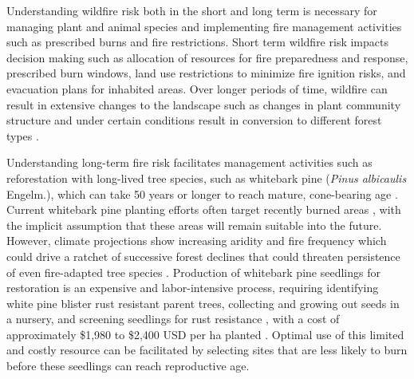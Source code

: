 \documentclass[11p]{article}
\begin{document}
Understanding wildfire risk both in the short and long term is necessary for managing plant and animal species and implementing fire management activities such as prescribed burns and fire restrictions. Short term wildfire risk impacts decision making such as allocation of resources for fire preparedness and response, prescribed burn windows, land use restrictions to minimize fire ignition risks, and evacuation plans for inhabited areas. Over longer periods of time, wildfire can result in extensive changes to the landscape such as changes in plant community structure and under certain conditions result in conversion to different forest types \citep{coopWildfireDrivenForestConversion2020}.

Understanding long-term fire risk facilitates management activities such as reforestation with long-lived tree species, such as whitebark pine (\textit{Pinus albicaulis} Engelm.), which can take 50 years or longer to reach mature, cone-bearing age \citep{tombackWhitebarkPineCommunities2001}. Current whitebark pine planting efforts often target recently burned areas \citep{keaneRangewideRestorationStrategy2012}, with the implicit assumption that these areas will remain suitable into the future. However, climate projections show increasing aridity and fire frequency which could drive a ratchet \citep{jacksonEcologyRatchetEvents2009} of successive forest declines that could threaten persistence of even fire-adapted tree species \citep{turnerMagnitudeDirectionTempo2022}. Production of whitebark pine seedlings for restoration is an expensive and labor-intensive process, requiring identifying white pine blister rust resistant parent trees, collecting and growing out seeds in a nursery, and screening seedlings for rust resistance \citep{tombackTammReviewCurrent2022}, with a cost of approximately \$1,980 to \$2,400 USD per ha planted \citep{tombackMagnificentHighElevationFiveNeedle2011}. Optimal use of this limited and costly resource can be facilitated by selecting sites that are less likely to burn before these seedlings can reach reproductive age.
\end{document}
